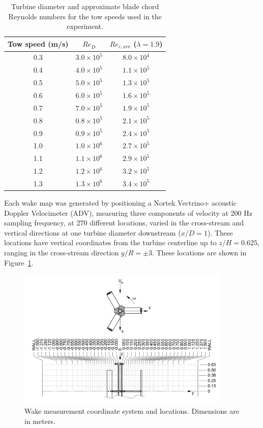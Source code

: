 \documentclass[energies,article,accept,moreauthors,pdftex,12pt,a4paper]{mdpi}
\begin{document}
\begin{table}
\centering
\begin{tabular}{ccc}
Tow speed (m/s) & $Re_D$ & $Re_{c,\mathrm{ave}}$ ($\lambda = 1.9$) \\ 
\hline
0.3 & $3.0 \times 10^5$ & $8.0 \times 10^4$ \\ 
0.4 & $4.0 \times 10^5$ & $1.1 \times 10^5$ \\ 
0.5 & $5.0 \times 10^5$ & $1.3 \times 10^5$ \\ 
0.6 & $6.0 \times 10^5$ & $1.6 \times 10^5$ \\ 
0.7 & $7.0 \times 10^5$ & $1.9 \times 10^5$ \\ 
0.8 & $0.8 \times 10^5$ & $2.1 \times 10^5$ \\ 
0.9 & $0.9 \times 10^5$ & $2.4 \times 10^5$ \\ 
1.0 & $1.0 \times 10^6$ & $2.7 \times 10^5$ \\ 
1.1 & $1.1 \times 10^6$ & $2.9 \times 10^5$ \\ 
1.2 & $1.2 \times 10^6$ & $3.2 \times 10^5$ \\ 
1.3 & $1.3 \times 10^6$ & $3.4 \times 10^5$ \\ 
\end{tabular} 
\caption{Turbine diameter and approximate blade chord Reynolds numbers for the
tow speeds used in the experiment.}
\label{tab:Re}
\end{table}

Each wake map was generated by positioning a Nortek Vectrino+ acoustic Doppler
Velocimeter (ADV), measuring three components of velocity at 200 Hz sampling 
frequency, at 270 different locations, varied in the cross-stream and
vertical directions at one turbine diameter downstream ($x/D=1$). These
locations have vertical coordinates from the turbine centerline up to
$z/H=0.625$, ranging in the cross-stream direction $y/R = \pm 3$. These
locations are shown in Figure~\ref{fig:wake-locations}.

\begin{figure}
\centering
\includegraphics[width=0.9\textwidth]{figures/turbine_coordinate_system}
\caption{Wake measurement coordinate system and locations. Dimensions are in
meters.} 
\label{fig:wake-locations}
\end{figure}
\end{document}

